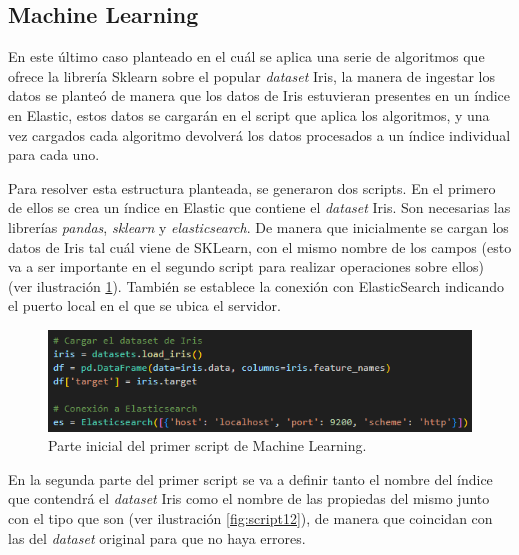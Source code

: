 \subsection{Machine Learning}

En este último caso planteado en el cuál se aplica una serie de algoritmos que ofrece la librería Sklearn sobre el popular \textit{dataset} Iris, la manera de ingestar los datos se planteó de manera que los datos de Iris estuvieran presentes en un índice en Elastic, estos datos se cargarán en el script que aplica los algoritmos, y una vez cargados cada algoritmo devolverá los datos procesados a un índice individual para cada uno.

Para resolver esta estructura planteada, se generaron dos scripts. En el primero de ellos se crea un índice en Elastic que contiene el \textit{dataset} Iris. Son necesarias las librerías \textit{pandas}, \textit{sklearn} y \textit{elasticsearch}. De manera que inicialmente se cargan los datos de Iris tal cuál viene de SKLearn, con el mismo nombre de los campos (esto va a ser importante en el segundo script para realizar operaciones sobre ellos)  (ver ilustración  \ref{fig:script11}). También se establece la conexión con ElasticSearch indicando el puerto local en el que se ubica el servidor.

\begin{figure}
    \centering
    \includegraphics[width=1\linewidth]{img/iris1.png}
    \caption{Parte inicial del primer script de Machine Learning.}
    \label{fig:script11}
\end{figure}

En la segunda parte del primer script se va a definir tanto el nombre del índice que contendrá el \textit{dataset} Iris como el nombre de las propiedas del mismo junto con el tipo que son  (ver ilustración  \ref{fig:script12}), de manera que coincidan con las del \textit{dataset} original para que no haya errores. 

